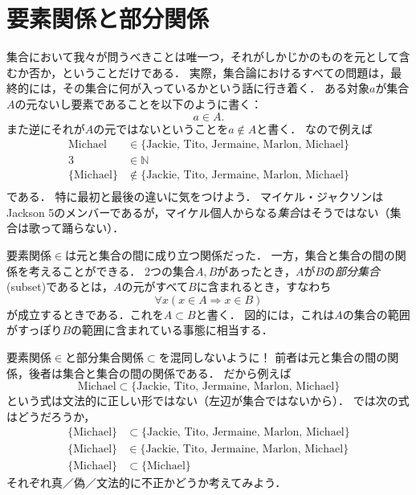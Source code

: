 \documentclass[11pt,a4paper]{jsarticle}
\begin{document}
\section{要素関係と部分関係}
集合において我々が問うべきことは唯一つ，それがしかじかのものを元として含むか否か，ということだけである．
実際，集合論におけるすべての問題は，最終的には，その集合に何が入っているかという話に行き着く．
ある対象$a$が集合$A$の元ないし要素であることを以下のように書く：
\[
 a \in A.
\]
また逆にそれが$A$の元ではないということを$a \not \in A$と書く．
なので例えば
\begin{align*}
\text{Michael} &\in \{ \text{Jackie, Tito, Jermaine, Marlon, Michael}\}  \\
3 &\in \mathbb{N} \\
\{ \text{Michael} \} &\not\in \{ \text{Jackie, Tito, Jermaine, Marlon, Michael}\}  \\
\end{align*}
である．
特に最初と最後の違いに気をつけよう．
マイケル・ジャクソンはJackson 5のメンバーであるが，マイケル個人からなる\emph{集合}はそうではない（集合は歌って踊らない）．

要素関係$\in$は元と集合の間に成り立つ関係だった．
一方，集合と集合の間の関係を考えることができる．
2つの集合$A, B$があったとき，$A$が$B$の\emph{部分集合}(subset)であるとは，$A$の元がすべて$B$に含まれるとき，すなわち
\[
 \forall x (x \in A \Rightarrow x \in B)
\]
が成立するときである．これを$A \subset B$と書く．
図的には，これは$A$の集合の範囲がすっぽり$B$の範囲に含まれている事態に相当する．

\begin{attn}
要素関係$\in$と部分集合関係$\subset$を混同しないように！
前者は元と集合の間の関係，後者は集合と集合の間の関係である．
だから例えば
\[
\text{Michael} \subset \{ \text{Jackie, Tito, Jermaine, Marlon, Michael}\}  
\]
という式は文法的に正しい形ではない（左辺が集合ではないから）．
では次の式はどうだろうか，
\begin{align*}
\{ \text{Michael} \} &\subset \{ \text{Jackie, Tito, Jermaine, Marlon, Michael}\}  \\
\{ \text{Michael} \} &\in \{ \text{Jackie, Tito, Jermaine, Marlon, Michael}\}  \\
\{ \text{Michael} \} &\subset \{ \text{Michael}\}   
\end{align*}
それぞれ真／偽／文法的に不正かどうか考えてみよう．
\end{attn}
\end{document}
